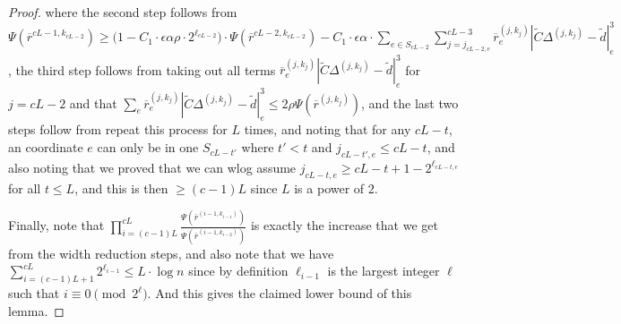 \documentclass[11pt]{article}
\newcommand\dd{\boldsymbol{\mathit{d}}}
\newcommand\rr{\boldsymbol{\mathit{r}}}
\newcommand\rrbar{\overline{\boldsymbol{\mathit{r}}}}
\newcommand\CC{\boldsymbol{\mathit{C}}}
\newcommand{\wt}{\widetilde}
\newcommand{\ov}{\overline}
\begin{document}
\begin{proof}
where the second step follows from $\Psi(\ov{\rr}^{cL-1,k_{cL-2}}) \geq \Big(1 -  C_1 \cdot \epsilon \alpha \rho \cdot 2^{\ell_{cL-2}}\Big) \cdot \Psi(\ov{\rr}^{cL-2, k_{cL-2}}) - C_1 \cdot \epsilon \alpha \cdot \sum_{e \in S_{cL-2}} \sum_{j=j_{cL-2,e}}^{cL-3} \ov{\rr}^{(j,k_j)}_e |\wt{\CC}\Delta^{(j,k_j)}-\wt{\dd}|_e^3$, the third step follows from taking out all terms $\ov{\rr}^{(j,k_j)}_e |\wt{\CC}\Delta^{(j,k_j)}-\wt{\dd}|_e^3$ for $j = cL-2$ and that $\sum_e \rrbar_e^{(j,k_{j})} |\wt{\CC}\Delta^{(j,k_{j})}-\wt{\dd}|_e^3\leq 2\rho\Psi(\rrbar^{(j,k_{j})})$, and the last two steps follow from repeat this process for $L$ times, and noting that for any $cL-t$, an coordinate $e$ can only be in one $S_{cL-t'}$ where $t' < t$ and $j_{cL-t',e} \leq cL-t$, and also noting that we proved that we can wlog assume $j_{cL-t,e} \geq cL-t+1-2^{\ell_{cL-t,e}}$ for all $t\leq L$, and this is then $\geq (c-1)L$ since $L$ is a power of $2$. 

Finally, note that $\prod_{i=(c-1)L}^{cL} \frac{\Psi(\ov{\rr}^{(i-1, k_{i-1})})}{\Psi(\ov{\rr}^{(i-1, k_{i-2})})}$ is exactly the increase that we get from the width reduction steps, and also note that we have $\sum_{i=(c-1)L+1}^{cL} 2^{\ell_{i-1}} \leq L \cdot \log n$ since by definition $\ell_{i-1}$ is the largest integer $\ell$ such that $i \equiv 0 \pmod{2^{\ell}}$. And this gives the claimed lower bound of this lemma. 
\end{proof}
\end{document}
